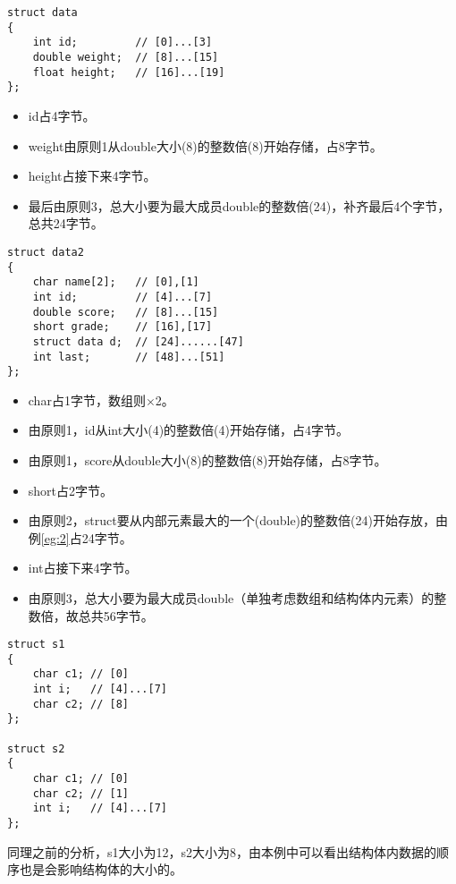 \documentclass[compact]{note}
\begin{document}
\begin{example}
\label{eg:2}
\begin{lstlisting}
struct data
{
    int id;         // [0]...[3]
    double weight;  // [8]...[15]
    float height;   // [16]...[19]
};
\end{lstlisting}
\end{example}
\begin{analysis}
\begin{itemize}
	\itemsep -3pt
	\item id占4字节。
	\item weight由原则1从double大小(8)的整数倍(8)开始存储，占8字节。
	\item height占接下来4字节。
	\item 最后由原则3，总大小要为最大成员double的整数倍(24)，补齐最后4个字节，总共24字节。
\end{itemize}
\end{analysis}

\begin{example}
\begin{lstlisting}
struct data2
{
    char name[2];   // [0],[1]
    int id;         // [4]...[7]
    double score;   // [8]...[15]
    short grade;    // [16],[17]
    struct data d;  // [24]......[47]
    int last;       // [48]...[51]
};
\end{lstlisting}
\end{example}
\begin{analysis}
\begin{itemize}
	\itemsep -3pt
	\item char占1字节，数组则$\times$2。
	\item 由原则1，id从int大小(4)的整数倍(4)开始存储，占4字节。
	\item 由原则1，score从double大小(8)的整数倍(8)开始存储，占8字节。
	\item short占2字节。
	\item 由原则2，struct要从内部元素最大的一个(double)的整数倍(24)开始存放，由例\ref{eg:2}占24字节。
	\item int占接下来4字节。
	\item 由原则3，总大小要为最大成员double（单独考虑数组和结构体内元素）的整数倍，故总共56字节。
\end{itemize}
\end{analysis}

\begin{example}
\begin{lstlisting}
struct s1
{   
    char c1; // [0]
    int i;   // [4]...[7]
    char c2; // [8]
};

struct s2
{  
    char c1; // [0]
    char c2; // [1]
    int i;   // [4]...[7]
};
\end{lstlisting}
\end{example}
\begin{analysis}
同理之前的分析，s1大小为12，s2大小为8，由本例中可以看出结构体内数据的顺序也是会影响结构体的大小的。
\end{analysis}
\end{document}
